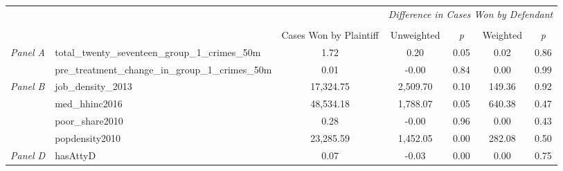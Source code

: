 \begin{tabular}{llccccc}
\toprule
 &  & \textit{} & \multicolumn{4}{c}{\textit{Difference in Cases Won by Defendant}} \\
\cline{4-7}
\\
 &  & Cases Won by Plaintiff & Unweighted & \emph{p} & Weighted & \emph{p} \\
\midrule
\multirow[c]{2}{3cm}{\textit{Panel A}} & total_twenty_seventeen_group_1_crimes_50m & 1.72 & 0.20 & 0.05 & 0.02 & 0.86 \\
 & pre_treatment_change_in_group_1_crimes_50m & 0.01 & -0.00 & 0.84 & 0.00 & 0.99 \\
\cline{1-7}
\multirow[c]{4}{3cm}{\textit{Panel B}} & job_density_2013 & 17,324.75 & 2,509.70 & 0.10 & 149.36 & 0.92 \\
 & med_hhinc2016 & 48,534.18 & 1,788.07 & 0.05 & 640.38 & 0.47 \\
 & poor_share2010 & 0.28 & -0.00 & 0.96 & 0.00 & 0.43 \\
 & popdensity2010 & 23,285.59 & 1,452.05 & 0.00 & 282.08 & 0.50 \\
\cline{1-7}
\textit{Panel D} & hasAttyD & 0.07 & -0.03 & 0.00 & 0.00 & 0.75 \\
\cline{1-7}
\bottomrule
\end{tabular}
